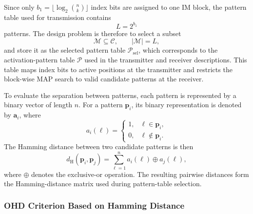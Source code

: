 Since only \(b_1=\lfloor \log_2 \binom{n}{k} \rfloor\) index bits are assigned to one IM block, the pattern table used for transmission contains
\begin{equation}
    L
    =
    2^{b_1}
    \label{eq:number_of_selected_patterns}
\end{equation}
patterns. The design problem is therefore to select a subset
\begin{equation}
    \mathcal{M}
    \subseteq
    \mathcal{C},
    \qquad
    |\mathcal{M}| = L,
    \label{eq:selected_pattern_subset}
\end{equation}
and store it as the selected pattern table \(\mathcal{P}_{\mathrm{sel}}\), which corresponds to the activation-pattern table \(\mathcal{P}\) used in the transmitter and receiver descriptions. This table maps index bits to active positions at the transmitter and restricts the block-wise MAP search to valid candidate patterns at the receiver.

To evaluate the separation between patterns, each pattern is represented by a binary vector of length \(n\). For a pattern \(\mathbf{p}_i\), its binary representation is denoted by \(\mathbf{a}_i\), where
\begin{equation}
    a_i(\ell)
    =
    \begin{cases}
    1, & \ell \in \mathbf{p}_i,\\
    0, & \ell \notin \mathbf{p}_i.
    \end{cases}
    \label{eq:binary_pattern_representation}
\end{equation}
The Hamming distance between two candidate patterns is then
\begin{equation}
    d_{\mathrm{H}}(\mathbf{p}_i,\mathbf{p}_j)
    =
    \sum_{\ell=1}^{n}
    a_i(\ell) \oplus a_j(\ell),
    \label{eq:ohd_pattern_hamming_distance}
\end{equation}
where \(\oplus\) denotes the exclusive-or operation. The resulting pairwise distances form the Hamming-distance matrix used during pattern-table selection.

\subsubsection{OHD Criterion Based on Hamming Distance}

